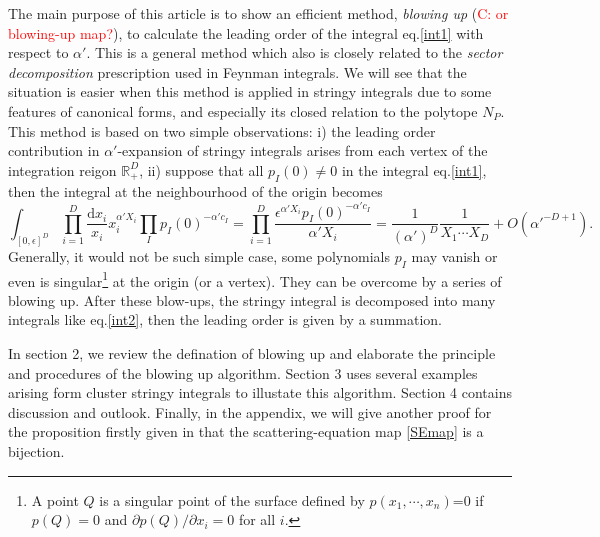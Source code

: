 \documentclass[12pt]{article}
\theoremstyle{definition}
\theoremstyle{plain}
\newcommand{\dif}{\mathrm{d}} %
\begin{document}
The main purpose of this article is to show an efficient method, {\it{blowing up}} (\textcolor{red}{C: or blowing-up map?}), to calculate the leading order of the integral eq.\eqref{int1} with respect to $\alpha'$. This is a general method which also is closely related to the {\it sector decomposition} prescription \cite{} used in Feynman integrals. We will see that the situation is easier when this method is applied in stringy integrals due to some features of canonical forms, and especially its closed relation to the polytope $N_{P}$. This method is based on two simple observations: i) the leading order contribution in $\alpha'$-expansion of stringy integrals arises from each vertex of the integration reigon $\mathds{R}_{+}^{D}$, ii) suppose that all $p_I(0)\neq 0$ in the integral eq.\eqref{int1}, then the integral at the neighbourhood of the origin becomes 
\begin{equation}\label{int2}
	\int_{[0,\epsilon]^D}\prod_{i=1}^D\frac{\dif x_i}{x_i}x_i^{\alpha' X_i} \prod_{I}p_{I}(0)^{-\alpha' c_{I}}
	=\prod_{i=1}^D\frac{\epsilon^{\alpha' X_i}p_{I}(0)^{-\alpha' c_{I}}}{\alpha' X_i}
	= \frac{1}{(\alpha')^D}\frac{1}{X_1\cdots X_D}+O(\alpha'^{-D+1}).
\end{equation}
Generally, it would not be such simple case, some polynomials $p_{I}$ may vanish or even is singular\footnote{A point $Q$ is a singular point of the surface defined by $p(x_{1},\cdots,x_{n})$=0 if $p(Q)=0$ and $\partial p(Q)/\partial x_{i} =0$ for all $i$. } at the origin (or a vertex).
They can be overcome by a series of blowing up. After these blow-ups, the 
stringy integral is decomposed into many integrals like eq.\eqref{int2}, then the leading order is given by a summation.


In section 2, we review the defination of blowing up and elaborate the principle and procedures of the blowing up algorithm. Section 3 uses several examples arising form cluster stringy integrals to illustate this algorithm. Section 4 contains discussion and outlook. Finally, in the appendix, we will give another proof for the proposition firstly given in \cite{Arkani-Hamed:2017tmz} that the scattering-equation map \eqref{SEmap} is a bijection. 
\end{document}
